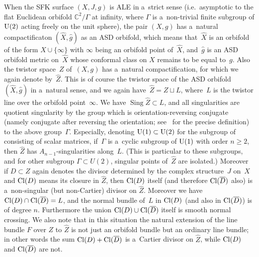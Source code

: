 \documentclass[11pt]{article}
\numberwithin{equation}{section}
\DeclareMathOperator{\Sing}{Sing}
\begin{document}
When the SFK surface $(X,J,g)$ is ALE in a~strict sense (i.e.\ asymptotic to the f\/lat Euclidean orbifold
$\mathbb{C}^2/\Gamma$ at inf\/inity, where $\Gamma$ is a~non-trivial f\/inite subgroup of ${\rm{U}}(2)$ acting freely on
the unit sphere), the pair $(X,g)$ has a~natural compactif\/icaton $(\hat X, \hat g)$ as an ASD orbifold, which means
that~$\hat X$ is an orbifold of the form $X\cup\{\infty\}$ with $\infty$ being an orbifold point of~$\hat X$, and~$\hat
g$ is an ASD orbifold metric on~$\hat X$ whose conformal class on $X$ remains to be equal to~$g$.
Also the twistor space~$Z$ of~$(X,g)$ has a~natural compactif\/ication, for which we again denote by~$\hat Z$.
This is of course the twistor space of the ASD orbifold~$(\hat X,\hat g)$ in a~natural sense, and we again have~$\hat Z
= Z\sqcup L$, where~$L$ is the twistor line over the orbifold point~$\infty$.
We have $\Sing\hat Z\subset L$, and all singularities are quotient singularity by the group which is
orientation-reversing conjugate (namely conjugate after reversing the orientation; see~\cite[Def\/inition~1.4]{V} for the precise
def\/inition) to the above group~$\Gamma$.
Especially, denoting ${\rm{U}}(1)\subset{\rm{U}}(2)$ for the subgroup of consisting of scalar matrices, if~$\Gamma$ is
a~cyclic subgroup of ${\rm{U}}(1)$ with order $n\ge 2$, then $\hat Z$ has $A_{n-1}$-singularities along~$L$.
(This is particular to these subgroups, and for other subgroup $\Gamma\subset U(2)$, singular points of~$\hat Z$ are
isolated.) Moreover if $D\subset Z$ again denotes the divisor determined by the complex structure~$J$ on~$X$ and
${\rm{Cl}}(D)$ means its closure in $\hat Z$, then ${\rm{Cl}}(D)$ itself (and therefore ${\rm{Cl}}(\overline D)$ also)
is a~non-singular (but non-Cartier) divisor on $\hat Z$.
Moreover we have ${\rm{Cl}}(D)\cap {\rm{Cl}}(\overline D)=L$, and the normal bundle of~$L$ in ${\rm{Cl}}(D)$ (and also
in ${\rm{Cl}}(\overline D)$) is of degree $n$.
Furthermore the union ${\rm{Cl}}(D) \cup {\rm{Cl}}(\overline D)$ itself is smooth normal crossing.
We also note that in this situation the natural extension of the line bundle $F$ over $Z$ to $\hat Z$ is not just an
orbifold bundle but an ordinary line bundle; in other words the sum ${\rm{Cl}}(D) + {\rm{Cl}}(\overline D)$ is a~Cartier
divisor on $\hat Z$, while ${\rm{Cl}}(D)$ and ${\rm{Cl}}(\overline D)$ are not.
\end{document}
